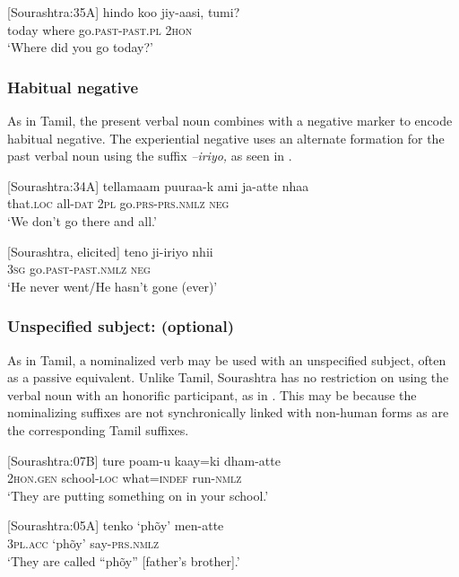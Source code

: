 \ea\label{smith:ex:36}
{}[Sourashtra:35A]
\gll hindo koo{\textrtailt} jiy-aasi, tumi?\\ 
today where go.\textsc{past}-\textsc{past}.\textsc{pl} 2\textsc{hon} \\
 `Where did you go today?'
\z


\subsubsection{Habitual negative }%
As in Tamil, the present verbal noun combines with a negative marker to encode habitual negative. The experiential negative uses an alternate formation for the past verbal noun using the suffix \textit{{}--iriyo, }as seen in .

\ea\label{smith:ex:37}
{}[Sourashtra:34A]
\gll tellamaam puuraa-k ami ja-atte nhaa \\
that.\textsc{loc} all-\textsc{dat} 2\textsc{pl} go.\textsc{prs}-\textsc{prs}.\textsc{nmlz} \textsc{neg} \\
`We don't go there and all.'
\z

\ea\label{smith:ex:38}
{}[Sourashtra, elicited]
\gll teno ji-iriyo nhii\\
3\textsc{sg} go.\textsc{past}-\textsc{past}.\textsc{nmlz} \textsc{neg}\\
`He never went/He hasn't gone (ever)'
\z

\subsubsection{Unspecified subject: (optional) }%

As in Tamil, a nominalized verb may be used with an unspecified subject, often as a passive equivalent. Unlike Tamil, Sourashtra has no restriction on using the verbal noun with an honorific participant, as in . This may be because the nominalizing suffixes are not synchronically linked with non-human forms as are the corresponding Tamil suffixes.

\ea\label{smith:ex:39}
{}[Sourashtra:07B]
\gll ture po{\textrtaill}{\textrtailt}am-u kaay=ki dham-atte\\
  2\textsc{hon}.\textsc{gen} school-\textsc{loc} what=\textsc{indef} run-\textsc{nmlz} \\
`They are putting something on in your school.'
\z

\ea\label{smith:ex:40}
{}[Sourashtra:05A]
\gll tenko `ph\~oy' men-atte\\
3\textsc{pl}.\textsc{acc} `ph\~oy' say-\textsc{prs}.\textsc{nmlz}\\
`They are called ``ph\~oy'' [father's brother].'
\z

